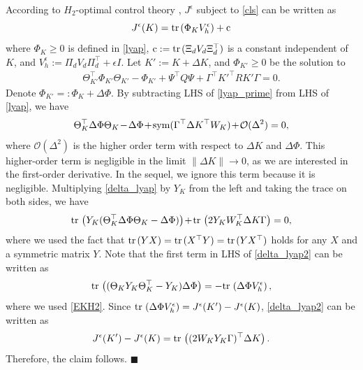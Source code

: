 \documentclass[preprint,5p,times,twocolumn]{elsarticle}
\def\tr{{\rm tr} \hspace{0.5mm}}
\def\h{\hspace{-0.5mm}}
\def\qed{\hfill $\blacksquare$}
\begin{document}
According to $H_2$-optimal control theory \cite{soderstrom2002discrete}, $J^{\epsilon}$ subject to \eqref{cls} can be written as
\begin{equation}\label{Je_initial}
J^{\epsilon}(K) = \tr(\Phi_KV_h^{\epsilon}) + {\rm c}
\end{equation}
where $\Phi_K \geq 0$ is defined in \eqref{lyap}, ${\rm c} := \tr(\Xi_dV_d\Xi_d^{\top})$ is a constant independent of $K$, and $V_h^{\epsilon} := \Pi_d V_d \Pi_d^{\top}+{\epsilon}I$. Let $K' := K + \Delta K$, and $\Phi_{K'} \geq 0$ be the solution to 
\begin{align}
    \Theta_{K'}^{\top} \Phi_{K'} \Theta_{K'} - \Phi_{K'} + \Psi^{\top}Q\Psi  + \Gamma^{\top}{K'}^{\top}R{K'}\Gamma = 0. \label{lyap_prime}
\end{align}
Denote $\Phi_{K'} =: \Phi_K + \Delta \Phi$. By subtracting LHS of \eqref{lyap_prime} from LHS of \eqref{lyap}, we have
\begin{align}
    \Theta_K^{\top}\Delta\Phi\Theta_K \h -\h \Delta \Phi \h+ \h {\rm sym}(\Gamma^{\top}\Delta K^{\top}W_K) \h +\h \mathcal O(\Delta^2) = 0, \label{delta_lyap}
\end{align}
where $\mathcal O(\Delta^2)$ is the higher order term with respect to $\Delta K$ and $\Delta \Phi$. This higher-order term is negligible in the limit $\|\Delta K\| \to 0$, as we are interested in the first-order derivative. 
In the sequel, we ignore this term because it is negligible. Multiplying \eqref{delta_lyap} by $Y_K$ from the left and taking the trace on both sides, we have
\begin{align}
    \tr\left(Y_K(\Theta_K^{\top}\Delta\Phi\Theta_K - \Delta \Phi)\right) \h +\h \tr\left(2Y_KW_K^{\top}\Delta K\Gamma\right) = 0, \label{delta_lyap2}  
\end{align}
where we used the fact that $\tr(YX) = \tr(X^{\top}Y)=\tr(YX^{\top})$ holds for any $X$ and a symmetric matrix $Y$. Note that the first term in LHS of \eqref{delta_lyap2} can be written as 
\begin{align}
    \tr\left((\Theta_KY_K\Theta_K^{\top} - Y_K)\Delta\Phi\right) = -\tr\left(\Delta\Phi V_h^{\epsilon}\right), 
\end{align}
where we used \eqref{EKH2}. Since $\tr\left(\Delta\Phi V_h^{\epsilon}\right) = J^{\epsilon}(K')-J^{\epsilon}(K)$, \eqref{delta_lyap2} can be written as 
\begin{align}
    J^{\epsilon}(K')-J^{\epsilon}(K) = \tr\left(
    (2W_KY_K\Gamma)^{\top}\Delta K
    \right).
\end{align}
Therefore, the claim follows. \qed
\end{document}
